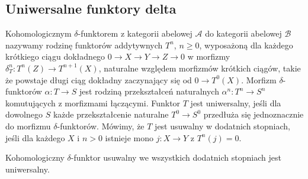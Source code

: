 \subsection{Uniwersalne funktory delta}
\begin{definicja}\label{cat:def:delta-functor}
Kohomologicznym $\delta$-funktorem z kategorii abelowej $\mathcal A$ do kategorii abelowej $\mathcal B$ nazywamy rodzinę funktorów addytywnych $T^n$, $n\ge0$, wyposażoną dla każdego krótkiego ciągu dokładnego $0\to X\to Y\to Z\to0$ w morfizmy $\delta_T^n:T^n(Z)\to T^{n+1}(X)$, naturalne względem morfizmów krótkich ciągów, takie że powstaje długi ciąg dokładny zaczynający się od $0\to T^0(X)$. Morfizm $\delta$-funktorów $\alpha:T\to S$ jest rodziną przekształceń naturalnych $\alpha^n:T^n\to S^n$ komutujących z morfizmami łączącymi. Funktor $T$ jest uniwersalny, jeśli dla dowolnego $S$ każde przekształcenie naturalne $T^0\to S^0$ przedłuża się jednoznacznie do morfizmu $\delta$-funktorów. Mówimy, że $T$ jest usuwalny w dodatnich stopniach, jeśli dla każdego $X$ i $n>0$ istnieje mono $j:X\to Y$ z $T^n(j)=0$.
\end{definicja}
\begin{twierdzenie}\label{cat:thm:effaceable-universal}
Kohomologiczny $\delta$-funktor usuwalny we wszystkich dodatnich stopniach jest uniwersalny.
\end{twierdzenie}
